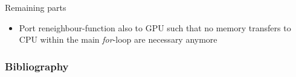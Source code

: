 \documentclass[12pt,xcolor={rgb},t]{beamer}
\begin{document}
\begin{frame}[fragile]{Remaining parts}

    \begin{itemize}
        \item Port reneighbour-function also to GPU such that no memory transfers to CPU within the main \textit{for}-loop are necessary anymore
    \end{itemize}

\end{frame}

\begin{frame}[allowframebreaks]

    \frametitle{Bibliography}
    
    

\end{frame}
\end{document}

